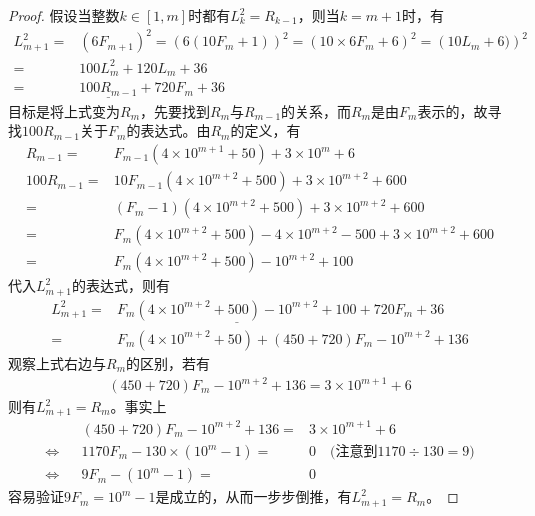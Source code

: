 \begin{proof}
  假设当整数$k\in[1, m]$时都有$L_k^2 = R_{k-1}$，则当$k=m+1$时，有
  \begin{align*}
    L_{m+1}^2 ={}& \left(6F_{m+1}\right)^2 = \left(6(10F_m+1) \right)^2 = \left( 10\times 6F_m + 6 \right)^2 = \left( 10L_m + 6 )\right)^2 \\
             ={}& 100L_m^2 + 120L_m + 36\\
             ={}& \underline{100R_{m-1}} + 720F_m + 36
  \end{align*}
  目标是将上式变为$R_m$，先要找到$R_m$与$R_{m-1}$的关系，而$R_m$是由$F_m$表示的，故寻找$100R_{m-1}$关于$F_m$的表达式。由$R_m$的定义，有
  \begin{align*}
    R_{m-1} ={}& F_{m-1}\left(4\times10^{m+1} + 50\right) + 3\times 10^{m} + 6\\
    100R_{m-1} ={}& 10F_{m-1} \left( 4\times10^{m+2} + 500\right) + 3\times10^{m+2} + 600\\
              ={}& (F_m-1) \left( 4\times10^{m+2} + 500\right) + 3\times10^{m+2} + 600\\
              ={}& F_m\left( 4\times10^{m+2} + 500\right) - 4\times10^{m+2} - 500 + 3\times10^{m+2} + 600\\
              ={}& F_m\left( 4\times10^{m+2} + 500\right) - 10^{m+2} + 100
  \end{align*}
  代入$L_{m+1}^2$的表达式，则有
  \begin{align*}
    L_{m+1}^2 ={}& \underline{F_m\left( 4\times10^{m+2} + 500\right) - 10^{m+2} + 100} + 720F_m + 36\\
             ={}& F_m\left( 4\times10^{m+2} + 50 \right) + (450 + 720)F_m - 10^{m+2} + 136
  \end{align*}
  观察上式右边与$R_m$的区别，若有
  \begin{align*}
    (450 + 720)F_m - 10^{m+2} + 136 = 3\times10^{m+1} + 6
  \end{align*}
  则有$L_{m+1}^2 = R_m$。事实上
  \begin{align*}
         &&(450 + 720)F_m - 10^{m+2} + 136 ={}& 3\times10^{m+1} + 6\\
    \iff && 1170F_m - 130\times(10^m - 1) ={}& 0 \quad\text{(注意到$1170\div130=9)$}\\
    \iff &&           9F_m - (10^{m} - 1) ={}& 0
  \end{align*}
  容易验证$9F_m = 10^m - 1$是成立的，从而一步步倒推，有$L_{m+1}^2 = R_m$。
\end{proof}


